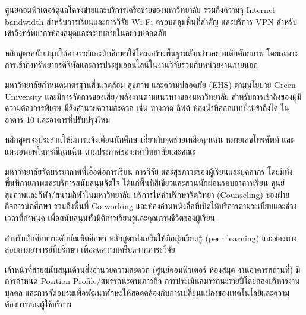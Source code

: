 ศูนย์คอมพิวเตอร์ดูแลโครงข่ายและบริการเครือข่ายของมหาวิทยาลัย รวมถึงความจุ Internet bandwidth สำหรับการเรียนและการวิจัย Wi-Fi ครอบคลุมพื้นที่สำคัญ และบริการ VPN สำหรับเข้าถึงทรัพยากรห้องสมุดและระบบภายในอย่างปลอดภัย

หลักสูตรสนับสนุนให้อาจารย์และนักศึกษาใช้โครงสร้างพื้นฐานดังกล่าวอย่างเต็มศักยภาพ โดยเฉพาะการเข้าถึงทรัพยากรดิจิทัลและการประชุมออนไลน์ในงานวิจัยร่วมกับหน่วยงานภายนอก


มหาวิทยาลัยกำหนดมาตรฐานสิ่งแวดล้อม สุขภาพ และความปลอดภัย (EHS) ตามนโยบาย Green University และมีการจัดการของเสีย/พลังงานตามแนวทางของมหาวิทยาลัย สำหรับการเข้าถึงของผู้มีความต้องการพิเศษ มีสิ่งอำนวยความสะดวก เช่น ทางลาด ลิฟต์ ห้องน้ำที่ออกแบบให้เข้าถึงได้ ในอาคาร 10 และอาคารที่ปรับปรุงใหม่

หลักสูตรจะประสานให้มีการแจ้งเตือนนักศึกษาเกี่ยวกับจุดช่วยเหลือฉุกเฉิน หมายเลขโทรศัพท์ และแผนอพยพในกรณีฉุกเฉิน ตามประกาศของมหาวิทยาลัยและคณะ


มหาวิทยาลัยจัดบรรยากาศที่เอื้อต่อการเรียน การวิจัย และสุขภาวะของผู้เรียนและบุคลากร โดยมีทั้งพื้นที่กายภาพและบริการสนับสนุนจิตใจ ได้แก่พื้นที่สีเขียวและสวนพักผ่อนรอบอาคารเรียน ศูนย์สุขภาพและกีฬา/สนามกีฬาในมหาวิทยาลัย บริการให้คำปรึกษาจิตวิทยา (Counseling) ของฝ่ายกิจการนักศึกษา รวมถึงพื้นที่ Co-working และห้องอ่านหนังสือที่เปิดให้บริการตามระเบียบและช่วงเวลาที่กำหนด เพื่อสนับสนุนทั้งมิติการเรียนรู้และคุณภาพชีวิตของผู้เรียน

สำหรับนักศึกษาระดับบัณฑิตศึกษา หลักสูตรส่งเสริมให้มีกลุ่มเรียนรู้ (peer learning) และช่องทางสอบถามอาจารย์ที่ปรึกษา เพื่อลดความเครียดจากภาระวิจัย


เจ้าหน้าที่สายสนับสนุนด้านสิ่งอำนวยความสะดวก (ศูนย์คอมพิวเตอร์ ห้องสมุด งานอาคารสถานที่) มีการกำหนด Position Profile/สมรรถนะตามภารกิจ การประเมินสมรรถนะรายปีโดยกองบริหารงานบุคคล และการจัดอบรมเพื่อพัฒนาทักษะให้สอดคล้องกับการเปลี่ยนแปลงของเทคโนโลยีและความต้องการของผู้ใช้บริการ

